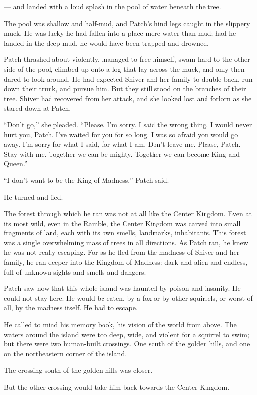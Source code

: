 \documentclass[12pt]{memoir}
\begin{document}
— and landed with a loud splash in the pool of water beneath the tree.

The pool was shallow and half-mud, and Patch’s hind legs caught in the
slippery muck. He was lucky he had fallen into a place more water than
mud; had he landed in the deep mud, he would have been trapped and
drowned.

Patch thrashed about violently, managed to free himself, swam hard to
the other side of the pool, climbed up onto a log that lay across the
muck, and only then dared to look around. He had expected Shiver and
her family to double back, run down their trunk, and pursue him. But
they still stood on the branches of their tree. Shiver had recovered
from her attack, and she looked lost and forlorn as she stared down at
Patch.

“Don’t go,” she pleaded. “Please. I’m sorry. I said the wrong thing. I
would never hurt you, Patch. I’ve waited for you for so long. I was so
afraid you would go away. I’m sorry for what I said, for what I
am. Don’t leave me. Please, Patch. Stay with me. Together we can be
mighty. Together we can become King and Queen.”

“I don’t want to be the King of Madness,” Patch said.

He turned and fled.

The forest through which he ran was not at all like the Center
Kingdom. Even at its most wild, even in the Ramble, the Center Kingdom
was carved into small fragments of land, each with its own smells,
landmarks, inhabitants. This forest was a single overwhelming mass of
trees in all directions. As Patch ran, he knew he was not really
escaping. For as he fled from the madness of Shiver and her family, he
ran deeper into the Kingdom of Madness: dark and alien and endless,
full of unknown sights and smells and dangers.

Patch saw now that this whole island was haunted by poison and
insanity. He could not stay here. He would be eaten, by a fox or by
other squirrels, or worst of all, by the madness itself. He had to
escape.

He called to mind his memory book, his vision of the world from
above. The waters around the island were too deep, wide, and violent
for a squirrel to swim; but there were two human-built crossings. One
south of the golden hills, and one on the northeastern corner of the
island.

The crossing south of the golden hills was closer.

But the other crossing would take him back towards the Center Kingdom.
\end{document}
